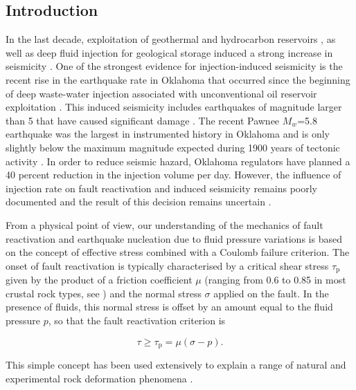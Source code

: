 \documentclass[grl]{agutex2arxiv}
\begin{document}
\begin{article}
  
\section{Introduction}

In the last decade, exploitation of geothermal and hydrocarbon reservoirs \citep{Warpinski1987,cornet1997}, as well as deep fluid injection for geological storage \citep{healy1968,raleigh1976,Zoback1997} induced a strong increase in seismicity \citep{Ellsworth2013}. One of the strongest evidence for injection-induced seismicity is the recent rise in the earthquake rate in Oklahoma that occurred since the beginning of deep waste-water injection associated with unconventional oil reservoir exploitation \citep{Ellsworth2013}. This induced seismicity includes earthquakes of magnitude larger than 5 that have caused significant damage \citep{Keranen2013,Rubinstein2014}. The recent Pawnee $M_w$=5.8 earthquake was the largest in instrumented history in Oklahoma and is only slightly below the maximum magnitude expected during 1900 years of tectonic activity \citep{Langenbruch2016}. %
In order to reduce seismic hazard, Oklahoma regulators have planned a 40 percent reduction in the injection volume per day. However, the influence of injection rate on fault reactivation and induced seismicity remains poorly documented and the result of this decision remains uncertain \citep{Dieterich2015,Langenbruch2016,Goebel2017,Barbour2017}.



From a physical point of view, our understanding of the mechanics of fault reactivation and earthquake nucleation due to fluid pressure variations is based on the concept of effective stress combined with a Coulomb failure criterion. The onset of fault reactivation is typically characterised by a critical shear stress $\tau_\mathrm{p}$ given by the product of a friction coefficient $\mu$ (ranging from 0.6 to 0.85 in most crustal rock types, see \citet{Byerlee1978}) and the normal stress $\sigma$ applied on the fault. In the presence of fluids, this normal stress is offset by an amount equal to the fluid pressure $p$, so that the fault reactivation criterion is \citep{Sibson1985a,Jaeger2009}
\begin{linenomath}
  \begin{equation}\label{eq:tau}
    \tau\geq\tau_\mathrm{p}=\mu(\sigma-p).
  \end{equation}
\end{linenomath}
This simple concept has been used extensively to explain a range of natural and experimental rock deformation phenomena \citep[see reviews in ][]{Scholz2002,Paterson2005}. 



\end{article}
\end{document}
